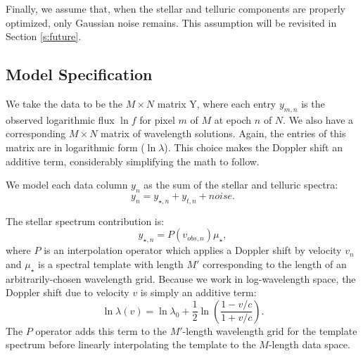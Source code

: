 \documentclass[modern]{aastex62}
\begin{document}

Finally, we assume that, when the stellar and telluric components are properly optimized, only Gaussian noise remains. 
This assumption will be revisited in Section \ref{s:future}.

\subsection{Model Specification}
\label{s:model-eqns}

We take the data to be the $M \times N$ matrix Y, where each entry $y_{m,n}$ is the observed logarithmic flux $\ln f$ for pixel $m$ of $M$ at epoch $n$ of $N$. 
We also have a corresponding $M \times N$ matrix of wavelength solutions. 
Again, the entries of this matrix are in logarithmic form ($\ln \lambda$). 
This choice makes the Doppler shift an additive term, considerably simplifying the math to follow.

We model each data column $y_n$ as the sum of the stellar and telluric spectra:
\begin{equation}
y_n = y_{\star, n} + y_{t, n} + noise.
\end{equation}

The stellar spectrum contribution is: 
\begin{equation}
y_{\star, n} = P(v_{obs, n}) \mu_{\star},
\end{equation}
where $P$ is an interpolation operator which applies a Doppler shift by velocity $v_n$ and $\mu_{\star}$ is a spectral template with length $M'$ corresponding to the length of an arbitrarily-chosen wavelength grid. 
Because we work in log-wavelength space, the Doppler shift due to velocity $v$ is simply an additive term:
\begin{equation}
 \ln \lambda(v) = \ln \lambda_{0} + \frac{1}{2} \ln \left(\frac{1 - v/c}{1 + v/c}\right).
\end{equation}
The $P$ operator adds this term to the $M'$-length wavelength grid for the template spectrum before linearly interpolating the template to the $M$-length data space.
\end{document}
